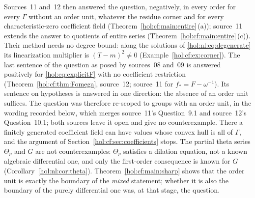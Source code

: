 \documentclass[11pt]{article}
\numberwithin{equation}{section}
\theoremstyle{definition}
\theoremstyle{remark}
\begin{document}
Sources~11 and~12 then answered the question, negatively, in every order for
every $\Gamma$ without an order unit, whatever the residue corner and for
every characteristic-zero coefficient field
(Theorem~\ref{hol:cf:main:entire}\,(a)); source~11 extends the answer to
quotients of entire series (Theorem~\ref{hol:cf:main:entire}\,(c)). Their
method needs no degree bound: along the solutions of
\eqref{hol:nl:eq:degenerate} its linearization multiplier is $(T-m)^2\ne0$
(Example~\ref{hol:cf:ex:corner}). The last sentence of the question as posed
by sources~08 and~09 is answered positively for \eqref{hol:eq:explicitF} with no coefficient restriction
(Theorem~\ref{hol:cf:thm:Fomega}, source~12; source~11 for
$f_*=F-\omega^{-1}$). Its sentence on hypotheses is answered in one direction:
the absence of an order unit suffices. The question was therefore re-scoped to
groups with an order unit, in the wording recorded below, which merges source~11's
Question~9.1 and source~12's Question~10.1; both sources leave it open and
give no counterexample. There a finitely generated coefficient field can have
values whose convex hull is all of $\Gamma$, and the argument of
Section~\ref{hol:cf:sec:coefficients} stops. The partial theta series
$\Theta_p$ and $G$ are not counterexamples: $\Theta_p$ satisfies a dilation
equation, not a known algebraic differential one, and only the first-order
consequence is known for $G$ (Corollary~\ref{hol:nl:cor:theta}).
Theorem~\ref{hol:cf:main:sharp} shows that the order unit is exactly the
boundary of the \emph{mixed} statement; whether it is also the boundary of the
purely differential one was, at that stage, the question.
\end{document}
